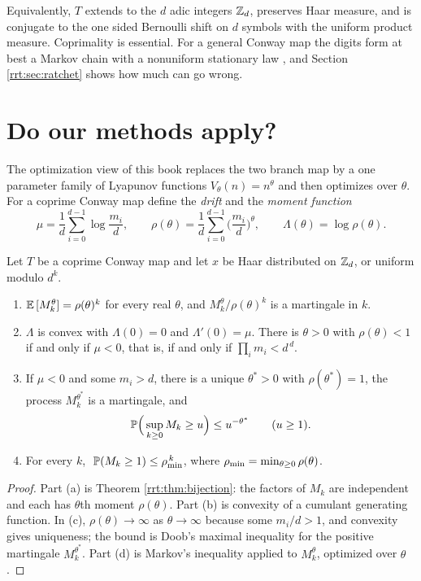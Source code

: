 Equivalently, $T$ extends to the $d$ adic integers $\mathbb{Z}_d$, preserves Haar measure, and is conjugate to the one sided Bernoulli shift on $d$ symbols with the uniform product measure. Coprimality is essential. For a general Conway map the digits form at best a Markov chain with a nonuniform stationary law \cite{leigh1986}, and Section \ref{rrt:sec:ratchet} shows how much can go wrong.

\section{Do our methods apply?}\label{rrt:sec:methods}

The optimization view of this book replaces the two branch map by a one parameter family of Lyapunov functions $V_\theta(n)=n^\theta$ and then optimizes over $\theta$. For a coprime Conway map define the \emph{drift} and the \emph{moment function}
\[
\mu=\frac1d\sum_{i=0}^{d-1}\log\frac{m_i}{d},\qquad
\rho(\theta)=\frac1d\sum_{i=0}^{d-1}\Big(\frac{m_i}{d}\Big)^{\theta},\qquad
\Lambda(\theta)=\log\rho(\theta).
\]

\begin{theorem}\label{rrt:thm:lyap}
Let $T$ be a coprime Conway map and let $x$ be Haar distributed on $\mathbb{Z}_d$, or uniform modulo $d^k$.
\begin{enumerate}
\item[(a)] $\mathbb{E}\,[M_k^\theta]=\rho(\theta)^k$ for every real $\theta$, and $M_k^\theta/\rho(\theta)^k$ is a martingale in $k$.
\item[(b)] $\Lambda$ is convex with $\Lambda(0)=0$ and $\Lambda'(0)=\mu$. There is $\theta>0$ with $\rho(\theta)<1$ if and only if $\mu<0$, that is, if and only if $\prod_i m_i<d^{\,d}$.
\item[(c)] If $\mu<0$ and some $m_i>d$, there is a unique $\theta^*>0$ with $\rho(\theta^*)=1$, the process $M_k^{\theta^*}$ is a martingale, and
\[
\mathbb{P}\Big(\sup_{k\ge 0} M_k \ge u\Big)\le u^{-\theta^*}\qquad (u\ge 1).
\]
\item[(d)] For every $k$, $\;\mathbb{P}(M_k\ge 1)\le \rho_{\min}^{\,k}$, where $\rho_{\min}=\min_{\theta\ge 0}\rho(\theta)$.
\end{enumerate}
\end{theorem}

\begin{proof}
Part (a) is Theorem \ref{rrt:thm:bijection}: the factors of $M_k$ are independent and each has $\theta$th moment $\rho(\theta)$. Part (b) is convexity of a cumulant generating function. In (c), $\rho(\theta)\to\infty$ as $\theta\to\infty$ because some $m_i/d>1$, and convexity gives uniqueness; the bound is Doob's maximal inequality for the positive martingale $M_k^{\theta^*}$. Part (d) is Markov's inequality applied to $M_k^{\theta}$, optimized over $\theta$.
\end{proof}

